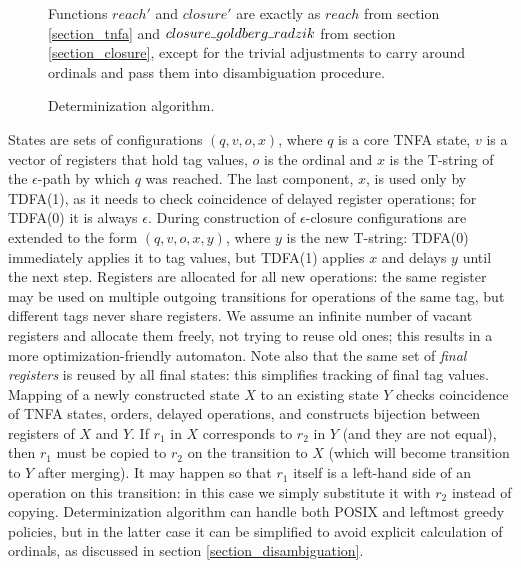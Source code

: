 \documentclass{article}
\newcommand{\Xund}{\rule{.4em}{.4pt}} %
\theoremstyle{definition}
\begin{document}
\begin{multicols}{2}
\begin{figure}
\begin{multicols}{2}
\end{multicols}
\begin{center}
\caption{Determinization algorithm.}
\footnotesize{
Functions $reach'$ and $closure'$ are exactly as
$reach$ from section \ref{section_tnfa} and $closure \Xund goldberg \Xund radzik$ from section \ref{section_closure},
except for the trivial adjustments to carry around ordinals and pass them into disambiguation procedure.
}
\end{center}
\end{figure}

States are sets of configurations $(q, v, o, x)$,
where $q$ is a core TNFA state, $v$ is a vector of registers that hold tag values, $o$ is the ordinal
and $x$ is the T-string of the $\epsilon$-path by which $q$ was reached.
The last component, $x$, is used only by TDFA(1), as it needs to check coincidence of delayed register operations;
for TDFA(0) it is always $\epsilon$.
During construction of $\epsilon$-closure configurations are extended to the form $(q, v, o, x, y)$,
where $y$ is the new T-string: TDFA(0) immediately applies it to tag values,
but TDFA(1) applies $x$ and delays $y$ until the next step.
Registers are allocated for all new operations:
the same register may be used on multiple outgoing transitions for operations of the same tag,
but different tags never share registers.
We assume an infinite number of vacant registers and allocate them freely, not trying to reuse old ones;
this results in a more optimization-friendly automaton.
Note also that the same set of \emph{final registers} is reused by all final states:
this simplifies tracking of final tag values.
Mapping of a newly constructed state $X$ to an existing state $Y$ checks coincidence of TNFA states, orders, delayed operations,
and constructs bijection between registers of $X$ and $Y$.
If $r_1$ in $X$ corresponds to $r_2$ in $Y$ (and they are not equal), then $r_1$ must be copied to $r_2$ on the transition to $X$
(which will become transition to $Y$ after merging).
It may happen so that $r_1$ itself is a left-hand side of an operation on this transition:
in this case we simply substitute it with $r_2$ instead of copying.
Determinization algorithm can handle both POSIX and leftmost greedy policies,
but in the latter case it can be simplified to avoid explicit calculation of ordinals, as discussed in section \ref{section_disambiguation}.


\end{multicols}
\end{document}
